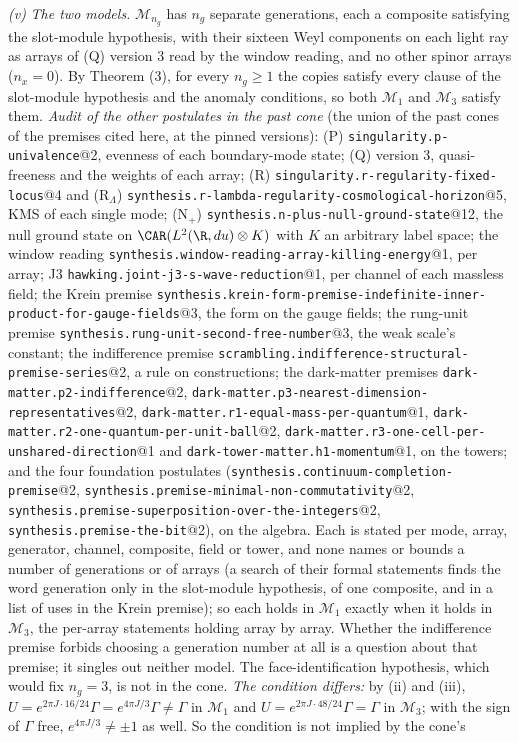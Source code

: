 \emph{(v)} \emph{The two models.} $\mathcal{M}_{n_{g}}$ has $n_{g}$ separate generations, each a composite satisfying the slot-module hypothesis, with their sixteen Weyl components on each light ray as arrays of (Q) version 3 read by the window reading, and no other spinor arrays ($n_{x} = 0$). By Theorem (3), for every $n_{g} \ge 1$ the copies satisfy every clause of the slot-module hypothesis and the anomaly conditions, so both $\mathcal{M}_{1}$ and $\mathcal{M}_{3}$ satisfy them. \emph{Audit of the other postulates in the past cone} (the union of the past cones of the premises cited here, at the pinned versions): (P) \texttt{singularity.p-univalence}@2, evenness of each boundary-mode state; (Q)  version 3, quasi-freeness and the weights of each array; (R) \texttt{singularity.r-regularity-fixed-locus}@4 and (R$_{\Lambda}$) \texttt{synthesis.r-lambda-regularity-cosmological-horizon}@5, KMS of each single mode; (N$_{+}$) \texttt{synthesis.n-plus-null-ground-state}@12, the null ground state on $\CAR(L^{2}(\R, du) \otimes K)$ with $K$ an arbitrary label space; the window reading \texttt{synthesis.window-reading-array-killing-energy}@1, per array; J3 \texttt{hawking.joint-j3-s-wave-reduction}@1, per channel of each massless field; the Krein premise \texttt{synthesis.krein-form-premise-indefinite-inner-product-for-gauge-fields}@3, the form on the gauge fields; the rung-unit premise \texttt{synthesis.rung-unit-second-free-number}@3, the weak scale's constant; the indifference premise \texttt{scrambling.indifference-structural-premise-series}@2, a rule on constructions; the dark-matter premises \texttt{dark-matter.p2-indifference}@2, \texttt{dark-matter.p3-nearest-dimension-representatives}@2, \texttt{dark-matter.r1-equal-mass-per-quantum}@1, \texttt{dark-matter.r2-one-quantum-per-unit-ball}@2, \texttt{dark-matter.r3-one-cell-per-unshared-direction}@1 and \texttt{dark-tower-matter.h1-momentum}@1, on the towers; and the four foundation postulates (\texttt{synthesis.continuum-completion-premise}@2, \texttt{synthesis.premise-minimal-non-commutativity}@2, \texttt{synthesis.premise-superposition-over-the-integers}@2, \texttt{synthesis.premise-the-bit}@2), on the algebra. Each is stated per mode, array, generator, channel, composite, field or tower, and none names or bounds a number of generations or of arrays (a search of their formal statements finds the word generation only in the slot-module hypothesis, of one composite, and in a list of uses in the Krein premise); so each holds in $\mathcal{M}_{1}$ exactly when it holds in $\mathcal{M}_{3}$, the per-array statements holding array by array. Whether the indifference premise forbids choosing a generation number at all is a question about that premise; it singles out neither model. The face-identification hypothesis, which would fix $n_{g} = 3$, is not in the cone. \emph{The condition differs:} by (ii) and (iii), $U = e^{2\pi J\cdot 16/24}\Gamma = e^{4\pi J/3}\Gamma \neq \Gamma$ in $\mathcal{M}_{1}$ and $U = e^{2\pi J\cdot 48/24}\Gamma = \Gamma$ in $\mathcal{M}_{3}$; with the sign of $\Gamma$ free, $e^{4\pi J/3} \ne \pm 1$ as well. So the condition is not implied by the cone's 